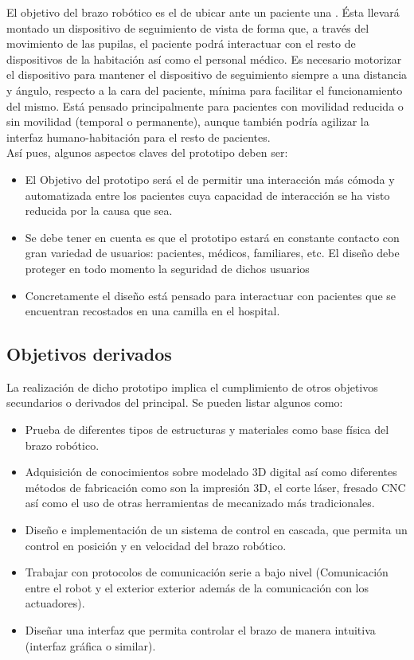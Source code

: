 El objetivo del brazo robótico es el de ubicar ante un paciente una . Ésta llevará montado un dispositivo de seguimiento de vista de forma que, a través del movimiento de las pupilas, el paciente podrá interactuar con el resto de dispositivos de la habitación así como el personal médico. Es necesario motorizar el dispositivo para mantener el dispositivo de seguimiento siempre a una distancia y ángulo, respecto a la cara del paciente, mínima para facilitar el funcionamiento del mismo. Está pensado principalmente para pacientes con movilidad reducida o sin movilidad (temporal o permanente), aunque también podría agilizar la interfaz humano-habitación para el resto de pacientes.
\\

Así pues, algunos aspectos claves del prototipo deben ser:
\begin{itemize}
    \item El Objetivo del prototipo será el de permitir una interacción más cómoda y automatizada entre los pacientes cuya capacidad de interacción se ha visto reducida por la causa que sea.
    \item Se debe tener en cuenta es que el prototipo estará en constante contacto con gran variedad de usuarios: pacientes, médicos, familiares, etc. El diseño debe proteger en todo momento la seguridad de dichos usuarios
    \item Concretamente el diseño está pensado para interactuar con pacientes que se encuentran recostados en una camilla en el hospital.
\end{itemize}

\subsection{Objetivos derivados}

La realización de dicho prototipo implica el cumplimiento de otros objetivos secundarios o derivados del principal. Se pueden listar algunos como:
\begin{itemize}
    \item Prueba de diferentes tipos de estructuras y materiales como base física del brazo robótico.
    \item Adquisición de conocimientos sobre modelado 3D digital así como diferentes métodos de fabricación como son la impresión 3D, el corte láser, fresado CNC así como el uso de otras herramientas de mecanizado más tradicionales.
    \item Diseño e implementación de un sistema de control en cascada, que permita un control en posición y en velocidad del brazo robótico.
    \item Trabajar con protocolos de comunicación serie a bajo nivel (Comunicación entre el robot y el exterior exterior además de la comunicación con los actuadores).
    \item Diseñar una interfaz que permita controlar el brazo de manera intuitiva (interfaz gráfica o similar).
\end{itemize}


